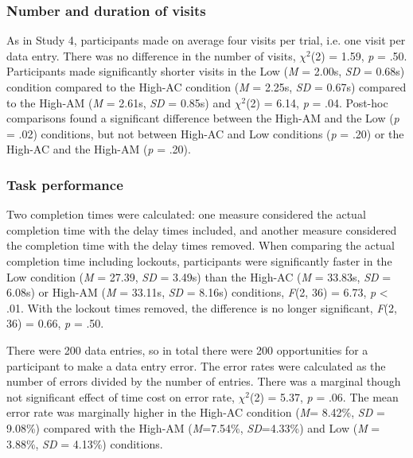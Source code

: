 \subsubsection{Number and duration of visits}
As in Study 4, participants made on average four visits per trial, i.e. one visit per data entry. There was no difference in the number of visits, $\chi^2$(2) = 1.59, \textit{p} = .50. Participants made significantly shorter visits in the Low (\textit{M} = 2.00s, \textit{SD} = 0.68s) condition compared to the High-AC condition (\textit{M} = 2.25s, \textit{SD} = 0.67s) compared to the High-AM (\textit{M} = 2.61s, \textit{SD} = 0.85s) and  $\chi^2$(2) = 6.14, \textit{p} = .04. Post-hoc comparisons found a significant difference between  the High-AM and the Low (\textit{p} = .02) conditions, but not between High-AC and Low conditions (\textit{p} = .20) or the High-AC and the High-AM (\textit{p} = .20).

\subsubsection{Task performance}
Two completion times were calculated: one measure considered the actual completion time with the delay times included, and another measure considered the completion time with the delay times removed. When comparing the actual completion time including lockouts, participants were significantly faster in the Low condition (\textit{M} = 27.39, \textit{SD} = 3.49s) than the High-AC (\textit{M} = 33.83s, \textit{SD} = 6.08s) or High-AM (\textit{M} = 33.11s, \textit{SD} = 8.16s) conditions, \textit{F}(2, 36) = 6.73, \textit{p} < .01. With the lockout times removed, the difference is no longer significant, \textit{F}(2, 36) = 0.66, \textit{p} = .50.

There were 200 data entries, so in total there were 200 opportunities for a participant to make a data entry error. The error rates were calculated as the number of errors divided by the number of entries. There was a marginal though not significant effect of time cost on error rate, $\chi^2$(2) = 5.37, \textit{p} = .06. The mean error rate was marginally higher in the High-AC condition (\textit{M}= 8.42\%, \textit{SD} = 9.08\%) compared with the High-AM (\textit{M}=7.54\%, \textit{SD}=4.33\%) and Low (\textit{M} = 3.88\%, \textit{SD} = 4.13\%) conditions. 


